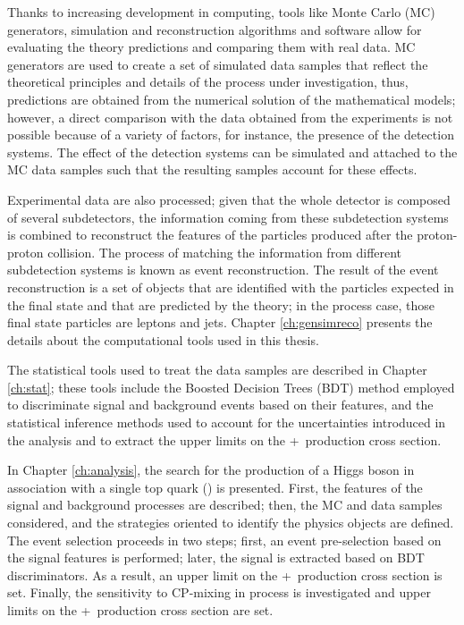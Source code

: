 Thanks to increasing development in computing, tools like Monte Carlo (MC) generators, simulation and reconstruction algorithms and software allow for evaluating the theory predictions and comparing them with real data. MC generators are used to create a set of simulated data samples that reflect the theoretical principles and details of the process under investigation, thus, predictions are obtained from the numerical solution of the mathematical models; however, a direct comparison with the data obtained from the experiments is not possible because of a variety of factors, for instance, the presence of the detection systems. The effect of the detection systems can be simulated and attached to the MC data samples such that the resulting samples account for these effects.

Experimental data are also processed; given that the whole detector is composed of several subdetectors, the information coming from these subdetection systems is combined to reconstruct the features of the particles produced after the proton-proton collision. The process of matching the information from different subdetection systems is known as event reconstruction. The result of the event reconstruction is a set of objects that are identified with the particles expected in the final state and that are predicted by the theory; in the \tH process case, those final state particles are leptons and jets. Chapter \ref{ch:gensimreco} presents the details about the computational tools used in this thesis.  

The statistical tools used to treat the data samples are described in Chapter \ref{ch:stat}; these tools include the Boosted Decision Trees (BDT) method employed to discriminate signal and background events based on their features, and the statistical inference methods used to account for the uncertainties introduced in the analysis and to extract the upper limits on the \tH+\ttH\ production cross section. 


In Chapter \ref{ch:analysis}, the search for the production of a Higgs boson in association with a single top quark (\tH) is presented. First, the features of the signal and background processes are described; then, the MC and data samples considered, and the strategies oriented to identify the physics objects are defined. The event selection proceeds in two steps; first, an event pre-selection based on the signal features is performed; later, the signal is extracted based on BDT discriminators. As a result, an upper limit on the \tH+\ttH\ production cross section is set. Finally, the  sensitivity to CP-mixing in \tH process is investigated and upper limits on the \tH+\ttH\ production cross section are set.   

